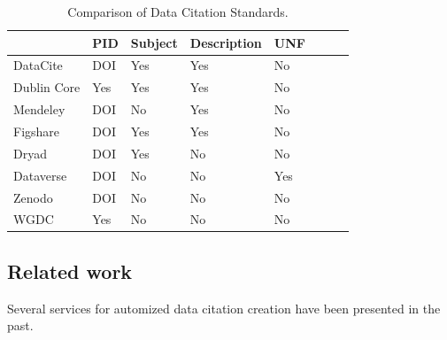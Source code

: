 \documentclass[letterpaper, twocolumn, parskip=half, fontsize=8pt, DIV=calc]{scrartcl}
\begin{document}
\begin{table}
    \caption{Comparison of Data Citation Standards.} 
    \begin{tabularx}{\columnwidth}{lll lll ll}
        \toprule
                                & PID   & Subject   & Description     & UNF \\ \midrule
        DataCite                & DOI   & Yes       & Yes       & No  \\
        Dublin Core             & Yes   & Yes       & Yes       & No  \\ 
        Mendeley                & DOI   & No        & Yes       & No  \\
        Figshare                & DOI   & Yes       & Yes       & No  \\
        Dryad                   & DOI   & Yes       & No        & No  \\
        Dataverse               & DOI   & No        & No        & Yes \\
        Zenodo                  & DOI   & No        & No        & No  \\
        WGDC                    & Yes   & No        & No        & No  \\
        \bottomrule
    \end{tabularx}
    \label{tab_snippet}
\end{table}












\subsection{Related work}
Several services for automized data citation creation have been presented in the past. 
\end{document}
